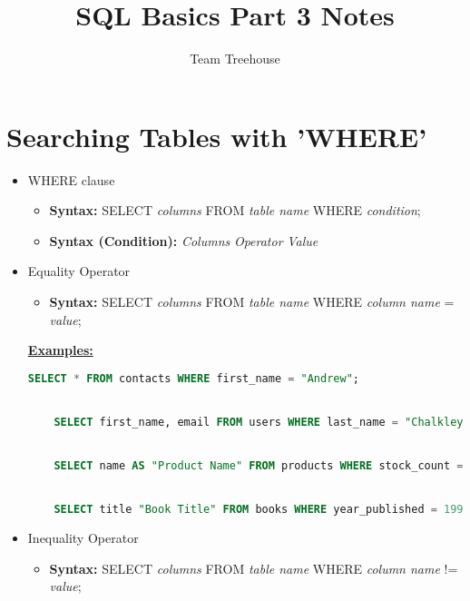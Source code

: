 \documentclass[12pt]{article}
\begin{document}
\title{SQL Basics Part 3 Notes}
\author{Team Treehouse}
\maketitle

\bigskip

\section{Searching Tables with 'WHERE'}

\bigskip

\begin{itemize}
    \item WHERE clause
    \begin{itemize}
        \item \textbf{Syntax:} SELECT \textit{columns} FROM \textit{table name} WHERE \textit{condition};
        \item \textbf{Syntax (Condition):} \textit{Columns} \textit{Operator} \textit{Value}
    \end{itemize}

    \item Equality Operator
    \begin{itemize}
        \item \textbf{Syntax:} SELECT \textit{columns} FROM \textit{table name} WHERE \textit{column name} = \textit{value};
    \end{itemize}

    \bigskip

    \underline{\textbf{Examples:}}

    \bigskip

    \begin{lstlisting}[language=SQL]
    SELECT * FROM contacts WHERE first_name = "Andrew";


    SELECT first_name, email FROM users WHERE last_name = "Chalkley";


    SELECT name AS "Product Name" FROM products WHERE stock_count = 0;


    SELECT title "Book Title" FROM books WHERE year_published = 1999;
    \end{lstlisting}

    \item Inequality Operator
    \begin{itemize}
        \item \textbf{Syntax:} SELECT \textit{columns} FROM \textit{table name} WHERE \textit{column name} != \textit{value};
    \end{itemize}


\end{itemize}
\end{document}
